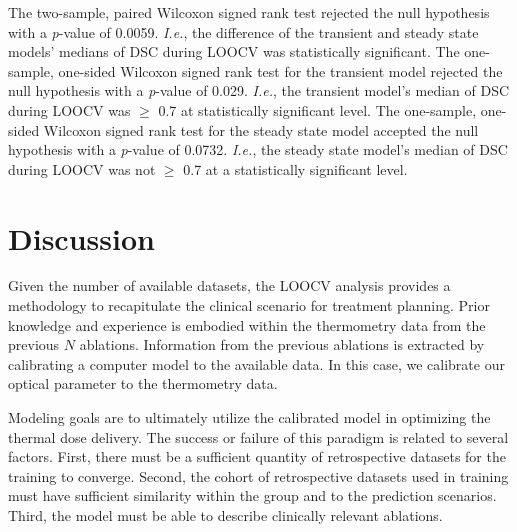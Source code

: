 \documentclass[12pt]{article}
\begin{document}
The two-sample, paired Wilcoxon signed rank test rejected the null hypothesis
with a \textit{p}-value of 0.0059.
\textit{I.e.}, the difference of the transient and steady state models' medians of DSC
during LOOCV was statistically significant.
The one-sample, one-sided Wilcoxon signed rank test for the transient model
rejected the null hypothesis with a \textit{p}-value of 0.029.
\textit{I.e.}, the transient model's median of DSC during LOOCV was $\geq$
0.7 at statistically significant level.
The one-sample, one-sided Wilcoxon signed rank test for the steady state model
accepted the null hypothesis with a \textit{p}-value of 0.0732.
\textit{I.e.}, the steady state model's median of DSC during LOOCV was
not $\geq$ 0.7 at a statistically significant level.



\section{Discussion}

Given the number of available datasets, the LOOCV analysis
provides a methodology to recapitulate the clinical scenario
for treatment planning. Prior knowledge and experience is embodied
within the thermometry data from the previous $N$ ablations.
Information from the previous ablations is extracted by calibrating
a computer model to the available data. 
In this case, we calibrate our optical parameter to the thermometry data.
{\color{red}
Modeling goals are to ultimately utilize the calibrated model in optimizing
the thermal dose delivery.
The success
or failure of this paradigm is related to several factors.
First, there must be a sufficient quantity of retrospective datasets
for the training to converge. Second, the cohort of retrospective
datasets used in training must have sufficient similarity within the group
and to the prediction scenarios. Third, the model must be able 
to describe clinically relevant ablations. 

}
\end{document}
